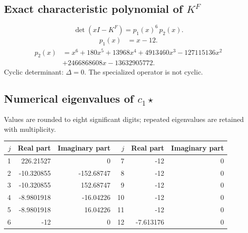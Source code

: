 \documentclass[10pt,a4paper]{article}
\begin{document}
\subsection*{Exact characteristic polynomial of $K^F$}
\[\det(xI-K^F)=p_{1}(x)^{6}\,p_{2}(x).\]
\[\begin{aligned}p_{1}(x)&=x - 12.\end{aligned}\]
\[\begin{aligned}p_{2}(x)&=x^{6} + 180 x^{5} + 13968 x^{4} + 4913460 x^{3} - 127115136 x^{2}\\&+2466868608 x - 13632905772.\end{aligned}\]
Cyclic determinant: $\Delta=0$. The specialized operator is not cyclic.
\subsection*{Numerical eigenvalues of $c_1\star$}
Values are rounded to eight significant digits; repeated eigenvalues are retained with multiplicity.
\begin{center}\small\begin{tabular}{rrr@{\qquad}rrr}\toprule $j$ & Real part & Imaginary part & $j$ & Real part & Imaginary part\\\midrule
1 & 226.21527 & 0 & 7 & -12 & 0\\
2 & -10.320855 & -152.68747 & 8 & -12 & 0\\
3 & -10.320855 & 152.68747 & 9 & -12 & 0\\
4 & -8.9801918 & -16.04226 & 10 & -12 & 0\\
5 & -8.9801918 & 16.04226 & 11 & -12 & 0\\
6 & -12 & 0 & 12 & -7.613176 & 0\\
\bottomrule\end{tabular}\end{center}
\end{document}
